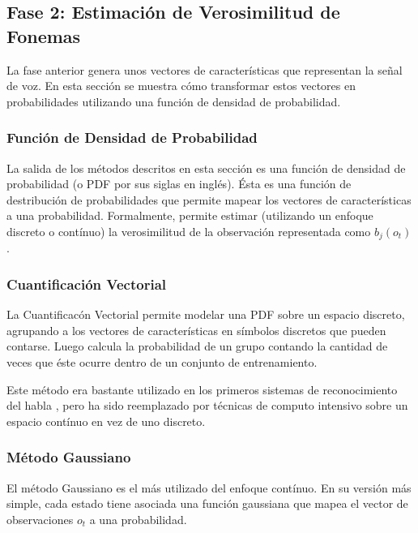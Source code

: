 \subsection{Fase 2: Estimaci\'{o}n de Verosimilitud de Fonemas}
\label{sec:phoneLikelihood}

La fase anterior genera unos vectores de caracter\'{i}sticas que representan la se\~{n}al de voz. En esta secci\'{o}n
se muestra c\'{o}mo transformar estos vectores en probabilidades utilizando una funci\'on de densidad
de probabilidad.

\subsubsection{Funci\'on de Densidad de Probabilidad}
\label{sec:pdfs}

La salida de los m\'etodos descritos en esta secci\'on es una funci\'on de densidad de probabilidad (o PDF por sus siglas en 
ingl\'es). \'Esta es una funci\'on de destribuci\'on de probabilidades que permite mapear los vectores de 
caracter\'isticas a una probabilidad. Formalmente, permite estimar (utilizando un enfoque discreto o cont\'inuo)
la verosimilitud de la observaci\'on representada como $b_j(o_t)$.

\subsubsection{Cuantificaci\'{o}n Vectorial}
\label{sec:vectorQuantization}

La Cuantificac\'{o}n Vectorial permite modelar una PDF sobre un espacio discreto, agrupando a los vectores de caracter\'{i}sticas en 
s\'{i}mbolos discretos que pueden contarse. Luego calcula la probabilidad de un grupo contando la cantidad de veces 
que \'{e}ste ocurre dentro de un conjunto de entrenamiento.

Este m\'{e}todo era bastante utilizado en los primeros sistemas de reconocimiento del habla \cite{Jurafsky}, pero ha sido reemplazado
por t\'{e}cnicas de computo intensivo sobre un espacio cont\'{i}nuo en vez de uno discreto.

\subsubsection{M\'etodo Gaussiano}
\label{sec:gaussianPdf}
El m\'{e}todo Gaussiano es el m\'{a}s utilizado del enfoque cont\'{i}nuo. En su versi\'{o}n m\'{a}s simple, cada estado tiene
asociada una funci\'{o}n gaussiana que mapea el vector de observaciones $o_t$ a una probabilidad.

